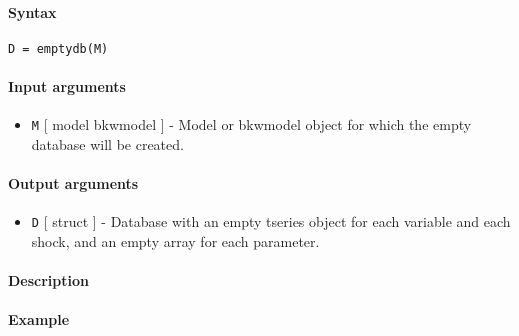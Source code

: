 


	\paragraph{Syntax}\label{syntax}

\begin{verbatim}
D = emptydb(M)
\end{verbatim}

\paragraph{Input arguments}\label{input-arguments}

\begin{itemize}
\itemsep1pt\parskip0pt
\item
  \texttt{M} {[} model \textbar{} bkwmodel {]} - Model or bkwmodel
  object for which the empty database will be created.
\end{itemize}

\paragraph{Output arguments}\label{output-arguments}

\begin{itemize}
\itemsep1pt\parskip0pt
\item
  \texttt{D} {[} struct {]} - Database with an empty tseries object for
  each variable and each shock, and an empty array for each parameter.
\end{itemize}

\paragraph{Description}\label{description}

\paragraph{Example}\label{example}


